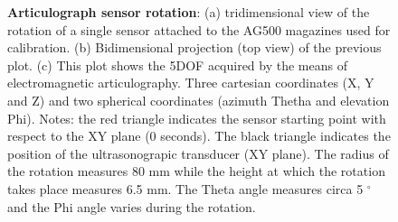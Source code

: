 \begin{figure}
	\caption[Articulograph sensor rotation]{\textbf{Articulograph sensor
	rotation}: (a) tridimensional view of the rotation of a single sensor
	attached to the AG500 magazines used for calibration. 
	(b) Bidimensional projection (top view) of the previous plot.
	(c) This plot shows the 5DOF acquired by the means of electromagnetic 
	articulography. Three cartesian coordinates (X, Y and Z) and two spherical
	coordinates (azimuth Thetha and elevation Phi).
	Notes: the red triangle indicates the sensor starting point with respect
	to the XY plane (0 seconds). 
	The black triangle indicates the position of the ultrasonograpic 
	transducer (XY plane).
	The radius of the rotation measures 80 mm while the height at which 
	the rotation takes place measures 6.5 mm. The Theta angle measures circa
	5 $^{\circ}$ and the Phi angle varies during the rotation.
	}
	\label{fig:linguometer:technical:interference:ex}
\end{figure}
